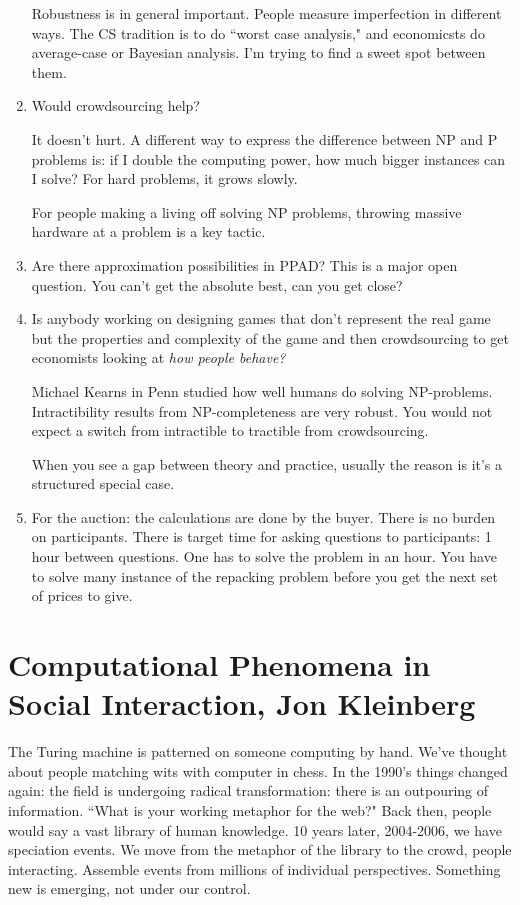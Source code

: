 \begin{enumerate}
Robustness is in general important. People measure imperfection in different ways. The CS tradition is to do ``worst case analysis," and economicsts do average-case or Bayesian analysis. I'm trying to find a sweet spot between them.
\item 
Would crowdsourcing help?

It doesn't hurt. A different way to express the difference between NP and P problems is: if I double the computing power, how much bigger instances can I solve? For hard problems, it grows slowly.

For people making a living off solving NP problems, throwing massive hardware at a problem is a key tactic.
\item
Are there approximation possibilities in PPAD? This is a major open question. You can't get the absolute best, can you get close?
\item
Is anybody working on designing games that don't represent the real game but the properties and complexity of the game and then crowdsourcing to get economists looking at {\it how people behave?}

Michael Kearns in Penn studied how well humans do solving NP-problems.  Intractibility results from NP-completeness are very robust. You would not expect a switch from intractible to tractible from crowdsourcing.

When you see a gap between theory and practice, usually the reason is it's a structured special case. 
\item
For the auction: the calculations are done by the buyer. 
There is no burden on participants.
There is target time for asking questions to participants: 1 hour between questions. One has to solve the problem in an hour. You have to solve many instance of the repacking problem before you get the next set of prices to give.
\end{enumerate}
\section{Computational Phenomena in Social Interaction, Jon Kleinberg}

The Turing machine is patterned on someone computing by hand. We've thought about people matching wits with computer in chess. In the 1990's things changed again: the field is undergoing radical transformation: there is an outpouring of information. ``What is your working metaphor for the web?" Back then, people would say a vast library of human knowledge. 10 years later, 2004-2006, we have speciation events. We move from the metaphor of the library to the crowd, people interacting. Assemble events from millions of individual perspectives. Something new is emerging, not under our control.

